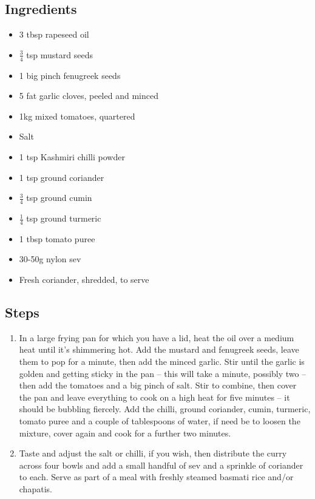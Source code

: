 \documentclass{book}
\begin{document}
\subsection*{Ingredients}
\begin{itemize}
\item 3 tbsp rapeseed oil 
\item $\frac{3}{4}$ tsp mustard seeds 
\item 1 big pinch fenugreek seeds 
\item 5 fat garlic cloves, peeled and minced 
\item 1kg mixed tomatoes, quartered
\item Salt
\item 1 tsp Kashmiri chilli powder
\item 1 tsp ground coriander 
\item $\frac{3}{4}$ tsp ground cumin 
\item $\frac{1}{4}$ tsp ground turmeric 
\item 1 tbsp tomato puree
\item 30-50g nylon sev
\item Fresh coriander, shredded, to serve
\end{itemize}

\subsection*{Steps}
\begin{enumerate}
\item In a large frying pan for which you have a lid, heat the oil over a medium heat until it’s shimmering hot. Add the mustard and fenugreek seeds, leave them to pop for a minute, then add the minced garlic. Stir until the garlic is golden and getting sticky in the pan – this will take a minute, possibly two – then add the tomatoes and a big pinch of salt. Stir to combine, then cover the pan and leave everything to cook on a high heat for five minutes – it should be bubbling fiercely. Add the chilli, ground coriander, cumin, turmeric, tomato puree and a couple of tablespoons of water, if need be to loosen the mixture, cover again and cook for a further two minutes.
\item Taste and adjust the salt or chilli, if you wish, then distribute the curry across four bowls and add a small handful of sev and a sprinkle of coriander to each. Serve as part of a meal with freshly steamed basmati rice and/or chapatis.
\end{enumerate}
\newpage
\end{document}
